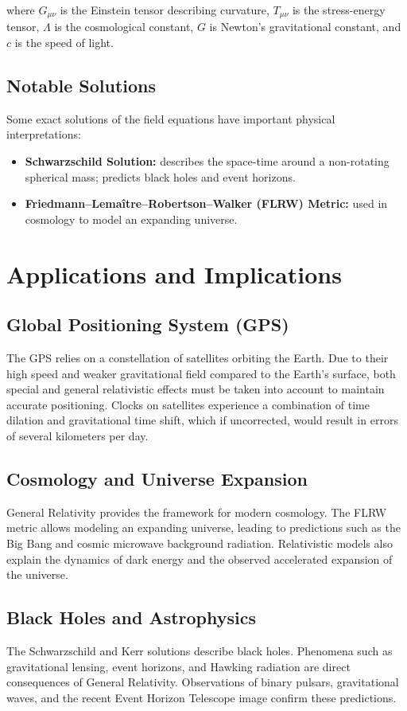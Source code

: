 \documentclass[12pt,a4paper]{article}
\begin{document}
where $G_{\mu\nu}$ is the Einstein tensor describing curvature, $T_{\mu\nu}$
is the stress-energy tensor, $\Lambda$ is the cosmological constant, $G$ is
Newton's gravitational constant, and $c$ is the speed of light.

\subsection{Notable Solutions}

Some exact solutions of the field equations have important physical interpretations:

\begin{itemize}
\item \textbf{Schwarzschild Solution:} describes the space-time around a
  non-rotating spherical mass; predicts black holes and event horizons.
\item \textbf{Friedmann–Lemaître–Robertson–Walker (FLRW) Metric:} used
  in cosmology to model an expanding universe.
\end{itemize}

\section{Applications and Implications}

\subsection{Global Positioning System (GPS)}
The GPS relies on a constellation of satellites orbiting the Earth.
Due to their high speed and weaker gravitational field compared to the
Earth's surface, both special and general relativistic effects must
be taken into account to maintain accurate positioning.
Clocks on satellites experience a combination of time dilation and
gravitational time shift, which if uncorrected, would result in
errors of several kilometers per day.

\subsection{Cosmology and Universe Expansion}
General Relativity provides the framework for modern cosmology.
The FLRW metric allows modeling an expanding universe, leading
to predictions such as the Big Bang and cosmic microwave background radiation.
Relativistic models also explain the dynamics of dark energy and the
observed accelerated expansion of the universe.

\subsection{Black Holes and Astrophysics}
The Schwarzschild and Kerr solutions describe black holes.
Phenomena such as gravitational lensing, event horizons,
and Hawking radiation are direct consequences of General Relativity.
Observations of binary pulsars, gravitational waves, and the recent
Event Horizon Telescope image confirm these predictions.
\end{document}

